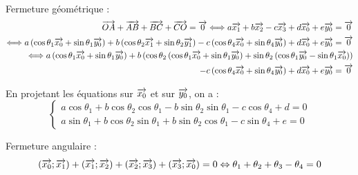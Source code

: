 \documentclass[10pt,fleqn]{article} %
\begin{document}
Fermeture géométrique : 
\begin{eqnarray*}
\overrightarrow{OA}+\overrightarrow{AB}+\overrightarrow{BC}+\overrightarrow{CO}=\overrightarrow{0} 
\Longleftrightarrow
a \overrightarrow{x_{1}} +  b \overrightarrow{x_{2}}-c \overrightarrow{x_{3}} + d \overrightarrow{x_{0}} + e\overrightarrow{y_{0}} =\overrightarrow{0}  \\
\Longleftrightarrow a \left(\cos \theta_1 \overrightarrow{x_{0}} + \sin\theta_1 \overrightarrow{y_{0}} \right) 
+b \left( \cos \theta_2 \overrightarrow{x_{1}} + \sin\theta_2 \overrightarrow{y_{1}}\right)
- c \left(\cos \theta_4 \overrightarrow{x_{0}} + \sin\theta_4 \overrightarrow{y_{0}} \right) 
+d \overrightarrow{x_{0}} 
+e \overrightarrow{y_{0}} =\overrightarrow{0} \\
\Longleftrightarrow a \left(\cos \theta_1 \overrightarrow{x_{0}} + \sin\theta_1 \overrightarrow{y_{0}} \right) 
+b \left( \cos \theta_2 \left(\cos \theta_1 \overrightarrow{x_{0}} + \sin\theta_1 \overrightarrow{y_{0}} \right) + \sin\theta_2 \left(\cos \theta_1 \overrightarrow{y_{0}} - \sin\theta_1 \overrightarrow{x_{0}} \right)\right)\\
- c \left(\cos \theta_4 \overrightarrow{x_{0}} + \sin\theta_4 \overrightarrow{y_{0}} \right) 
+d \overrightarrow{x_{0}} 
+e \overrightarrow{y_{0}} =\overrightarrow{0} \\
\end{eqnarray*}

En projetant les équations sur $\overrightarrow{x_0}$ et sur $\overrightarrow{y_0}$, on a :
$$
\left\{
\begin{array}{l}
a \cos \theta_1 + b\cos \theta_2 \cos \theta_1 
-b \sin\theta_2 \sin\theta_1 - c \cos \theta_4  
+d  =0  \\
a \sin\theta_1 + b\cos \theta_2 \sin\theta_1 + b\sin\theta_2 \cos \theta_1  
- c \sin\theta_4 +e  = 0
\end{array}
\right.
$$

Fermeture angulaire : 
$$
\left(\overrightarrow{x_{0}};\overrightarrow{x_{1}} \right)+\left(\overrightarrow{x_{1}};\overrightarrow{x_{2}} \right)
+\left(\overrightarrow{x_{2}};\overrightarrow{x_{3}} \right)+\left(\overrightarrow{x_{3}};\overrightarrow{x_{0}} \right) = 0
\Leftrightarrow 
\theta_1 +\theta_2 + \theta_3 - \theta_4 = 0
$$
\end{document}
